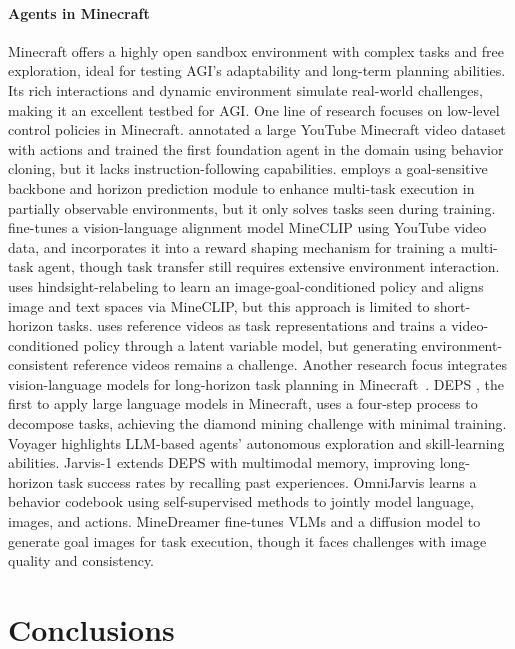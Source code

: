 \paragraph{Agents in Minecraft} 
Minecraft offers a highly open sandbox environment with complex tasks and free exploration, ideal for testing AGI’s adaptability and long-term planning abilities. Its rich interactions and dynamic environment simulate real-world challenges, making it an excellent testbed for AGI. 
One line of research focuses on low-level control policies in Minecraft. \cite{vpt} annotated a large YouTube Minecraft video dataset with actions and trained the first foundation agent in the domain using behavior cloning, but it lacks instruction-following capabilities. 
\cite{worldmc} employs a goal-sensitive backbone and horizon prediction module to enhance multi-task execution in partially observable environments, but it only solves tasks seen during training. \cite{minedojo} fine-tunes a vision-language alignment model MineCLIP using YouTube video data, and incorporates it into a reward shaping mechanism for training a multi-task agent, though task transfer still requires extensive environment interaction. \cite{steve1} uses hindsight-relabeling to learn an image-goal-conditioned policy and aligns image and text spaces via MineCLIP, but this approach is limited to short-horizon tasks. \cite{groot1} uses reference videos as task representations and trains a video-conditioned policy through a latent variable model, but generating environment-consistent reference videos remains a challenge. 
Another research focus integrates vision-language models for long-horizon task planning in Minecraft~\citep{plan4mc,rat,mp5,steveeye,liu2024rlgpt}. DEPS \citep{deps}, the first to apply large language models in Minecraft, uses a four-step process to decompose tasks, achieving the diamond mining challenge with minimal training. Voyager \citep{voyager} highlights LLM-based agents’ autonomous exploration and skill-learning abilities. Jarvis-1 \citep{jarvis-1} extends DEPS with multimodal memory, improving long-horizon task success rates by recalling past experiences. OmniJarvis \citep{omnijarvis} learns a behavior codebook using self-supervised methods to jointly model language, images, and actions. MineDreamer \citep{minedreamer} fine-tunes VLMs and a diffusion model to generate goal images for task execution, though it faces challenges with image quality and consistency.



\section{Conclusions}
\label{sec:conclusion}

